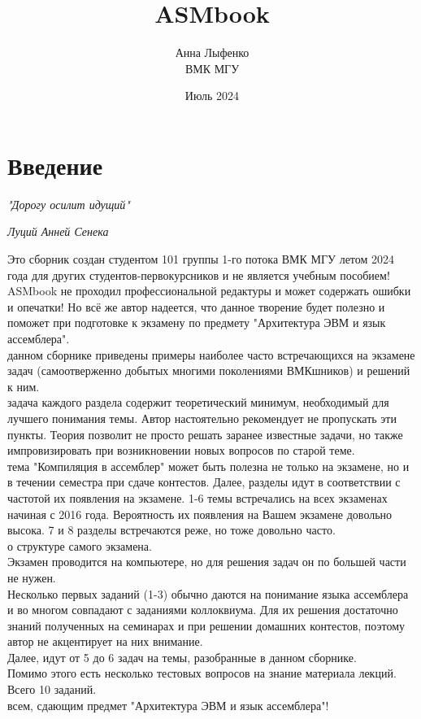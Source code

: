 \documentclass[12pt, letterpaper]{article}
\title{ASMbook}
\author{Анна Лыфенко\\ ВМК МГУ}
\date{Июль 2024}
\begin{document}
\maketitle
\thispagestyle{empty}
\newpage
\thispagestyle{empty}
\tableofcontents
\thispagestyle{empty}
\newpage
\section*{Введение}
\epigraph{\textit{"Дорогу осилит идущий"}}{\textit{Луций Анней Сенека}}
Это сборник создан студентом 101 группы 1-го потока ВМК МГУ летом 2024 года для других студентов-первокурсников и не является учебным пособием! ASMbook не проходил профессиональной редактуры и может содержать ошибки и опечатки! Но всё же автор надеется, что данное творение будет полезно и поможет при подготовке к экзамену по предмету "Архитектура ЭВМ и язык ассемблера".\\
 данном сборнике приведены примеры наиболее часто встречающихся на экзамене задач (самоотверженно добытых многими поколениями ВМКшников) и решений к ним.\\
 задача каждого раздела содержит теоретический минимум, необходимый для лучшего понимания темы. Автор настоятельно рекомендует не пропускать эти пункты. Теория позволит не просто решать заранее известные задачи, но также импровизировать при возникновении новых вопросов по старой теме.\\
 тема "Компиляция в ассемблер" может быть полезна не только на экзамене, но и в течении семестра при сдаче контестов. Далее, разделы идут в соответствии с частотой их появления на экзамене. 1-6 темы встречались на всех экзаменах начиная с 2016 года. Вероятность их появления на Вашем экзамене довольно высока. 7 и 8 разделы встречаются реже, но тоже довольно часто.\\
 о структуре самого экзамена.\\
Экзамен проводится на компьютере, но для решения задач он по большей части не нужен. \\
Несколько первых заданий (1-3) обычно даются на понимание языка ассемблера и во многом совпадают с заданиями коллоквиума. Для их решения достаточно знаний полученных на семинарах и при решении домашних контестов, поэтому автор не акцентирует на них внимание.\\
Далее, идут от 5 до 6 задач на темы, разобранные в данном сборнике.\\
Помимо этого есть несколько тестовых вопросов на знание материала лекций.\\
Всего 10 заданий.\\
 всем, сдающим предмет "Архитектура ЭВМ и язык ассемблера"!\\
\end{document}
